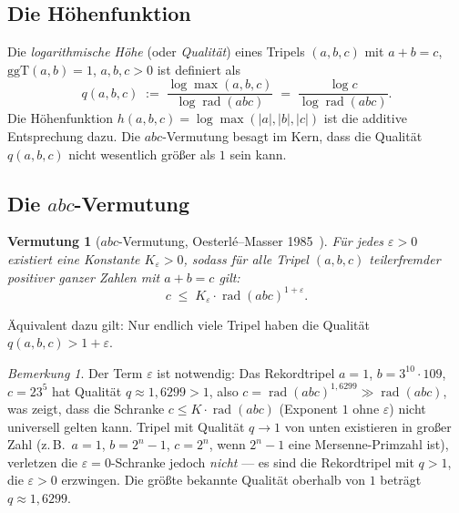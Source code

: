 \documentclass[12pt,a4paper]{article}
\newtheorem{conjecture}[theorem]{Vermutung}
\theoremstyle{remark}
\newtheorem{remark}[theorem]{Bemerkung}
\newcommand{\ggT}{\mathrm{ggT}}
\begin{document}
\subsection{Die Höhenfunktion}

Die \emph{logarithmische Höhe} (oder \emph{Qualität}) eines Tripels $(a, b, c)$ mit
$a+b=c$, $\ggT(a,b)=1$, $a,b,c>0$ ist definiert als
\begin{equation}\label{eq:qualitaet}
  q(a,b,c) \;:=\; \frac{\log\max(a,b,c)}{\log\operatorname{rad}(abc)}
             \;=\; \frac{\log c}{\log\operatorname{rad}(abc)}.
\end{equation}
Die Höhenfunktion $h(a,b,c) = \log\max(|a|,|b|,|c|)$ ist die additive Entsprechung dazu.
Die $abc$-Vermutung besagt im Kern, dass die Qualität $q(a,b,c)$ nicht wesentlich
größer als $1$ sein kann.

\subsection{Die $abc$-Vermutung}

\begin{conjecture}[$abc$-Vermutung, Oesterlé--Masser 1985~\cite{Oesterle1988,Masser1985}]
  Für jedes $\varepsilon > 0$ existiert eine Konstante $K_\varepsilon > 0$, sodass für
  alle Tripel $(a,b,c)$ teilerfremder positiver ganzer Zahlen mit $a + b = c$ gilt:
  \begin{equation}\label{eq:abc}
    c \;\leq\; K_\varepsilon \cdot \operatorname{rad}(abc)^{1+\varepsilon}.
  \end{equation}
\end{conjecture}

Äquivalent dazu gilt: Nur endlich viele Tripel haben die Qualität $q(a,b,c) > 1+\varepsilon$.

\begin{remark}
  Der Term $\varepsilon$ ist notwendig: Das Rekordtripel $a=1$, $b=3^{10}\cdot109$,
  $c=23^5$ hat Qualität $q \approx 1{,}6299 > 1$, also $c = \operatorname{rad}(abc)^{1{,}6299}
  \gg \operatorname{rad}(abc)$, was zeigt, dass die Schranke $c \leq K \cdot \operatorname{rad}(abc)$
  (Exponent $1$ ohne $\varepsilon$) nicht universell gelten kann.  Tripel mit Qualität
  $q \to 1$ von unten existieren in großer Zahl (z.\,B.\ $a=1$, $b=2^n-1$, $c=2^n$,
  wenn $2^n-1$ eine Mersenne-Primzahl ist), verletzen die $\varepsilon=0$-Schranke
  jedoch \emph{nicht} — es sind die Rekordtripel mit $q > 1$, die $\varepsilon > 0$
  erzwingen.  Die größte bekannte Qualität oberhalb von $1$ beträgt $q \approx 1{,}6299$.
\end{remark}
\end{document}
